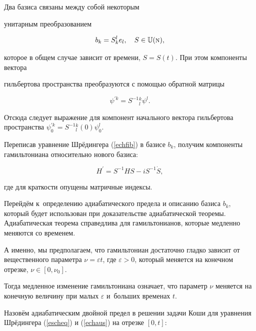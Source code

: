 Два базиса связаны между собой некоторым

унитарным преобразованием

\begin{equation}                                                  \label{ebatra}

  b_k=S_k^l e_l,\quad S\in{\mathbb U}({\textsc{n}}),

\end{equation}

которое в общем случае зависит от времени, $S=S(t)$. При этом компоненты вектора

гильбертова пространства преобразуются с помощью обратной матрицы

\begin{equation*}

  \psi^{\prime k}=S^{-1}{}_l^k\psi^l.

\end{equation*}

Отсюда следует выражение для компонент начального вектора гильбертова пространства $\psi^{\prime k}_0=S^{-1}{}_l^k(0)\psi^l_0$. 

Переписав уравнение Шрёдингера (\ref{echfib}) в базисе $b_k$, получим компоненты гамильтониана относительно нового базиса:

\begin{equation}                                                  \label{enewha}

  H^\prime{}=S^{-1}HS-iS^{-1}\dot S,

\end{equation}

где для краткости опущены матричные индексы.



Перейдём к~определению адиабатического предела и описанию базиса $b_k$, который будет использован при доказательстве адиабатической теоремы. Адиабатическая теорема справедлива для гамильтонианов, которые медленно меняются со временем. 

А именно, мы предполагаем, что гамильтониан достаточно гладко зависит от вещественного параметра $\nu=\varepsilon t$, где $\varepsilon>0$, который меняется на конечном отрезке, $\nu\in[0,\nu_0]$. 

Тогда медленное изменение гамильтониана означает, что параметр $\nu$ меняется на конечную величину при малых $\varepsilon$ и~больших временах $t$. 

Назовём адиабатическим двойной предел в решении задачи Коши для уравнения Шрёдингера (\ref{escheq}) и (\ref{echaus}) на отрезке $[0, t]$:

